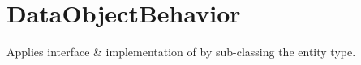 \section{DataObjectBehavior}
\label{feature:DataObjectBehavior}
\ClearAPI
Applies interface \& implementation of  by sub-classing the entity type.
\TODO